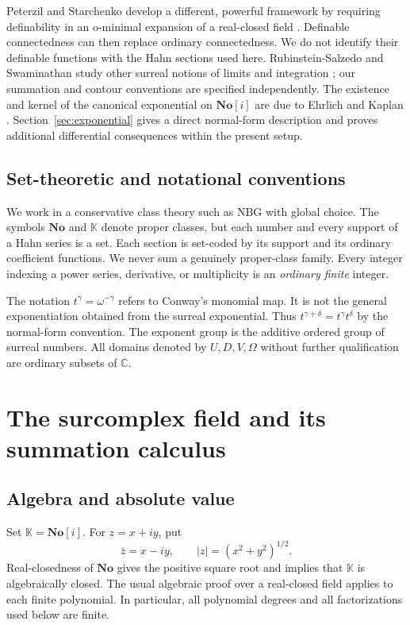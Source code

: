 \documentclass[11pt,oneside]{article}
\numberwithin{equation}{section}
\theoremstyle{definition}
\theoremstyle{remark}\newtheorem{remark}[theorem]{Remark}
\newcommand{\No}{\mathbf{No}}
\newcommand{\K}{\mathbb K}
\newcommand{\C}{\mathbb C}
\begin{document}
Peterzil and Starchenko develop a different, powerful framework by requiring
definability in an o-minimal expansion of a real-closed field
\cite{PS,PSsurvey}. Definable connectedness can then replace ordinary
connectedness. We do not identify their definable functions with the Hahn
sections used here. Rubinstein-Salzedo and Swaminathan study other surreal
notions of limits and integration \cite{RSS}; our summation and contour
conventions are specified independently. The existence and kernel of the
canonical exponential on $\No[i]$ are due to Ehrlich and Kaplan
\cite{EK}. Section~\ref{sec:exponential} gives a direct normal-form description
and proves additional differential consequences within the present setup.

\subsection{Set-theoretic and notational conventions}
We work in a conservative class theory such as NBG with global choice.
The symbols $\No$ and $\K$ denote proper classes, but each number and every
support of a Hahn series is a set. Each section is set-coded by its support
and its ordinary coefficient functions. We never sum a genuinely
proper-class family. Every integer indexing a power series, derivative, or
multiplicity is an \emph{ordinary finite} integer.

The notation $t^\gamma=\omega^{-\gamma}$ refers to Conway's monomial map.
It is not the general exponentiation obtained from the surreal exponential.
Thus $t^{\gamma+\delta}=t^\gamma t^\delta$ by the normal-form convention.
The exponent group is the additive ordered group of surreal numbers.
All domains denoted by $U,D,V,\Omega$ without further qualification are
ordinary subsets of $\C$.

\section{The surcomplex field and its summation calculus}
\subsection{Algebra and absolute value}
Set $\K=\No[i]$. For $z=x+iy$, put
\[
 \overline z=x-iy,\qquad |z|=(x^2+y^2)^{1/2}.
\]
Real-closedness of $\No$ gives the positive square root and implies that
$\K$ is algebraically closed. The usual algebraic proof over a real-closed
field applies to each finite polynomial. In particular, all polynomial
degrees and all factorizations used below are finite.
\end{document}
